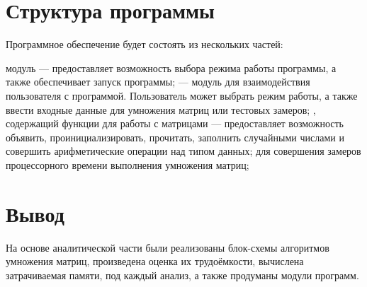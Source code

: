 \section{Структура программы}
Программное обеспечение будет состоять из нескольких частей:
\begin{itemize}
	 модуль — предоставляет возможность выбора режима работы программы, а также обеспечивает запуск программы;
	 — модуль для взаимодействия пользователя с программой. Пользователь может выбрать режим работы, а также ввести входные данные для умножения матриц или тестовых замеров;
	, содержащий функции для работы с матрицами — предоставляет возможность объявить, проинициализировать, прочитать, заполнить случайными числами и совершить арифметические операции над типом данных;
	 для совершения замеров процессорного времени выполнения умножения матриц;
\end{itemize}

\section*{Вывод}
На основе аналитической части были реализованы блок-схемы алгоритмов умножения матриц, произведена оценка их трудоёмкости, вычислена затрачиваемая памяти, под каждый анализ, а также продуманы модули программ.

\clearpage
